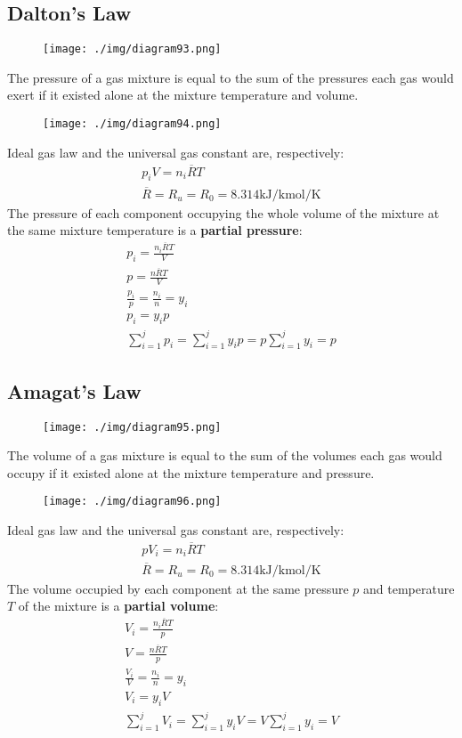 \subsection{Dalton's Law}
\begin{figure}[H]
  \centering
  \texttt{[image: ./img/diagram93.png]}
  \caption{}
\end{figure}
The pressure of a gas mixture is equal to the sum of the pressures each gas would exert if it existed alone at the mixture temperature and volume.
\begin{figure}[H]
  \centering
  \texttt{[image: ./img/diagram94.png]}
  \caption{}
\end{figure}
Ideal gas law and the universal gas constant are, respectively:
\begin{gather}
  p_iV = n_i\overline{R}T \\[5pt]
  \overline{R} = R_u = R_0 = 8.314 \si{\kilo\joule\per\kilo\mole\per\kelvin}
\end{gather}
The pressure of each component occupying the whole volume of the mixture at the same mixture temperature is a \textbf{partial pressure}:
\begin{gather}
  p_i = \frac{n_i \overline{R} T}{V} \\[5pt]
  p = \frac{n \overline{R} T}{V} \\[5pt]
  \frac{p_i}{p} = \frac{n_i}{n} = y_i \\[5pt]
  p_i = y_ip \\[5pt]
  \sum_{i=1}^{j}p_i = \sum_{i=1}^{j}y_ip = p\sum_{i=1}^{j}y_i = p
\end{gather}
\subsection{Amagat’s Law}
\begin{figure}[H]
  \centering
  \texttt{[image: ./img/diagram95.png]}
  \caption{}
\end{figure}
The volume of a gas mixture is equal to the sum of the volumes each gas would occupy if it existed alone at the mixture temperature and pressure.
\begin{figure}[H]
  \centering
  \texttt{[image: ./img/diagram96.png]}
  \caption{}
\end{figure}
Ideal gas law and the universal gas constant are, respectively:
\begin{gather}
  pV_i = n_i\overline{R}T \\[5pt]
  \overline{R} = R_u = R_0 = 8.314 \si{\kilo\joule\per\kilo\mole\per\kelvin}
\end{gather}
The volume occupied by each component at the same pressure $p$ and temperature $T$ of the mixture is a \textbf{partial volume}:
\begin{gather}
  V_i = \frac{n_i \overline{R} T}{p} \\[5pt]
  V = \frac{n \overline{R} T}{p} \\[5pt]
  \frac{V_i}{V} = \frac{n_i}{n} = y_i \\[5pt]
  V_i = y_iV \\[5pt]
  \sum_{i=1}^{j}V_i = \sum_{i=1}^{j}y_iV = V\sum_{i=1}^{j}y_i = V
\end{gather}
